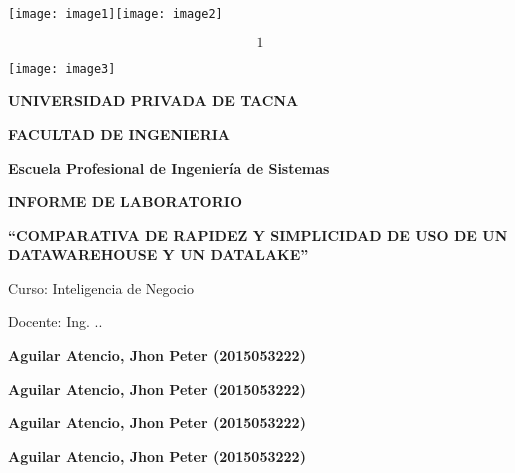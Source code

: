 \documentclass{article} %
\begin{document}


\noindent 

\noindent 

\noindent 

\noindent 

\noindent \texttt{[image: image1]}\texttt{[image: image2]}\textbf{ }

\noindent 

\noindent 
\[1\] 


\noindent \texttt{[image: image3]}\textbf{\underbar{}}

\noindent \textbf{}

\noindent \textbf{UNIVERSIDAD PRIVADA DE TACNA}

\noindent \textbf{}

\noindent \textbf{FACULTAD DE INGENIERIA}

\noindent \textbf{\textit{}}

\noindent \textbf{\textit{}}

\noindent \textbf{Escuela Profesional de Ingenier\'{i}a de Sistemas}

\noindent \textbf{}

\noindent 

\noindent \textbf{ INFORME DE LABORATORIO}

\noindent \textbf{``COMPARATIVA DE RAPIDEZ Y SIMPLICIDAD DE USO DE UN DATAWAREHOUSE Y UN DATALAKE''}

\noindent \textbf{}

\noindent Curso: Inteligencia de Negocio

\noindent \textbf{\textit{}}

\noindent \textbf{}

\noindent \textbf{}

\noindent Docente: Ing. ..

\noindent \textbf{}

\noindent \textbf{Aguilar Atencio, Jhon Peter (2015053222)}

\noindent \textbf{Aguilar Atencio, Jhon Peter (2015053222)}

\noindent \textbf{Aguilar Atencio, Jhon Peter (2015053222)}

\noindent \textbf{Aguilar Atencio, Jhon Peter (2015053222)}

\noindent \textbf{}
\end{document}
